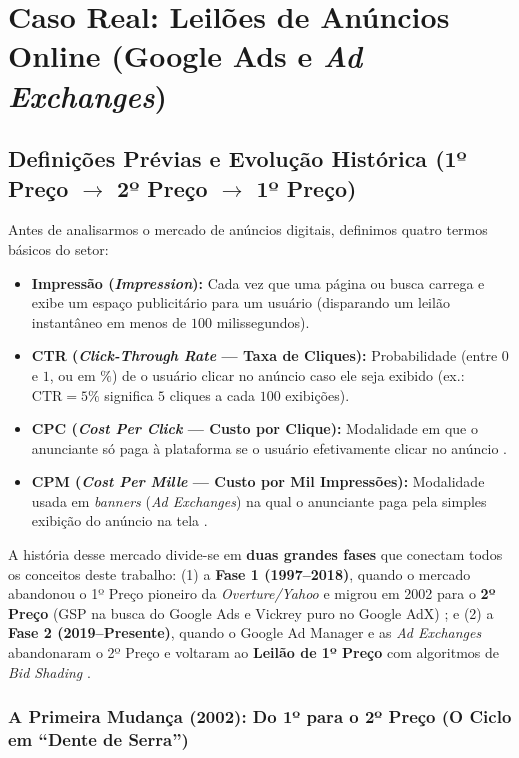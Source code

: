\section{Caso Real: Leilões de Anúncios Online (Google Ads e \textit{Ad Exchanges})}
\label{sec:caso_real}

\subsection{Definições Prévias e Evolução Histórica (\texorpdfstring{1º Preço $\to$ 2º Preço $\to$ 1º Preço}{1º Preço para 2º Preço para 1º Preço})}
\label{subsec:descricao_caso}

Antes de analisarmos o mercado de anúncios digitais, definimos quatro termos básicos do setor:
\begin{itemize}
    \item \textbf{Impressão (\textit{Impression}):} Cada vez que uma página ou busca carrega e exibe um espaço publicitário para um usuário (disparando um leilão instantâneo em menos de $100$ milissegundos).
    \item \textbf{CTR (\textit{Click-Through Rate} --- Taxa de Cliques):} Probabilidade (entre $0$ e $1$, ou em $\%$) de o usuário clicar no anúncio caso ele seja exibido (ex.: $\text{CTR} = 5\%$ significa $5$ cliques a cada $100$ exibições).
    \item \textbf{CPC (\textit{Cost Per Click} --- Custo por Clique):} Modalidade em que o anunciante só paga à plataforma se o usuário efetivamente clicar no anúncio \cite{edelman2007,varian2007}.
    \item \textbf{CPM (\textit{Cost Per Mille} --- Custo por Mil Impressões):} Modalidade usada em \textit{banners} (\textit{Ad Exchanges}) na qual o anunciante paga pela simples exibição do anúncio na tela \cite{despotakis2021}.
\end{itemize}

A história desse mercado divide-se em \textbf{duas grandes fases} que conectam todos os conceitos deste trabalho: (1) a \textbf{Fase 1 (1997--2018)}, quando o mercado abandonou o 1º Preço pioneiro da \textit{Overture/Yahoo} e migrou em 2002 para o \textbf{2º Preço} (GSP na busca do Google Ads e Vickrey puro no Google AdX) \cite{edelman2007,varian2007}; e (2) a \textbf{Fase 2 (2019--Presente)}, quando o Google Ad Manager e as \textit{Ad Exchanges} abandonaram o 2º Preço e voltaram ao \textbf{Leilão de 1º Preço} com algoritmos de \textit{Bid Shading} \cite{despotakis2021}.

\subsubsection{A Primeira Mudança (2002): Do 1º para o 2º Preço (O Ciclo em ``Dente de Serra'')}

